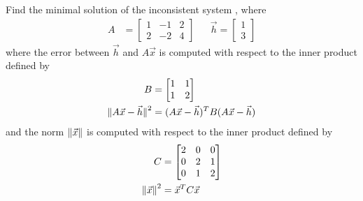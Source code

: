 \begin{exmp}
Find the minimal solution of the inconsistent system , where 
\begin{align*}
A &= 
\begin{bmatrix}
1 & -1 & 2 \\
2 & -2 & 4
\end{bmatrix} 
& & \vec{h} =
\begin{bmatrix}
1 \\
3
\end{bmatrix}
\end{align*} 
where the error between $\vec{h}$ and $A\vec{x}$ is computed with respect to the inner product defined by
\begin{align*}
B &= 
\begin{bmatrix}
1 & 1 \\
1 & 2
\end{bmatrix} \\
\norm{\smash{A\vec{x} - \vec{h}}}^2 &= (A\vec{x} - \vec{h})^T B(A\vec{x} - \vec{h})
\end{align*}
and the norm $\norm{\vec{x}}$ is computed with respect to the inner product defined by
\begin{align*}
C &= 
\begin{bmatrix}
2 & 0 & 0 \\
0 & 2 & 1 \\
0 & 1 & 2
\end{bmatrix} \\
\norm{\vec{x}}^2 &= \vec{x}^TC\vec{x}
\end{align*}
\end{exmp}

